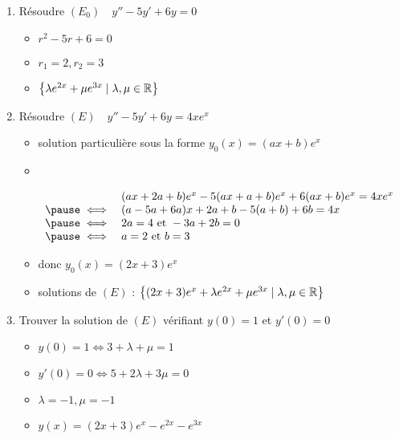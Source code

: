 \begin{frame}
\begin{exemple}
\begin{enumerate}
  \item Résoudre $(E_0) \quad y''-5y'+6y=0$
  \pause
  \begin{itemize}
    \item $r^2-5r+6=0$
    \pause
    \item $r_1=2, r_2=3$
    \pause
    \item $\big\{\lambda e^{2x}+ \mu e^{3x} \mid \lambda, \mu \in \mathbb{R}\big\}$
  \end{itemize}

  \pause
  \item Résoudre $(E) \quad y''-5y'+6y=4xe^x$
  \pause
  \begin{itemize}
    \item solution particulière sous la forme $y_0(x)=(ax+b)e^x$
    \pause
    
    \item ~ \hspace*{-2em} 
    \begin{minipage}{0.9\textwidth}%
    $\begin{array}{rl}
& (ax+2a+b)e^x-5(ax+a+b)e^x+6(ax+b)e^x=4xe^x \\ 
\pause
\iff & (a-5a+6a)x+2a+b-5(a+b)+6b=4x \\
\pause
\iff & 2a=4 \text{ et } -3a+2b=0 \\
\pause
\iff & a=2 \text{ et } b=3
\end{array}$  
    \end{minipage}

    
    \pause
    \item donc $y_0(x)=(2x+3)e^x$
    \pause
    \item solutions de $(E)$ : $\big\{(2x+3)e^x+\lambda e^{2x} + \mu e^{3x} \mid \lambda,\mu\in \mathbb{R}\big\}$ 

  \end{itemize}

  \pause
  \item Trouver la solution de $(E)$ vérifiant $y(0)=1$ et $y'(0)=0$
  \pause
  \begin{itemize}
    \item $y(0)=1 \iff 3+\lambda+\mu=1$
    \pause
    \item $y'(0)=0 \iff 5+2\lambda+3\mu=0$
    \pause
    \item $\lambda=-1, \mu=-1$
    \pause
    \item $y(x)=(2x+3)e^{x}-e^{2x}-e^{3x}$
  \end{itemize}  
  

\end{enumerate}  
\end{exemple}
\end{frame}

